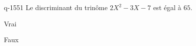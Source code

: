 \begin{truefalse}{q-1551}
Le discriminant du trinôme $2X^2-3X-7$ est égal à $65$.
\item* Vrai
\item Faux
\end{truefalse}

